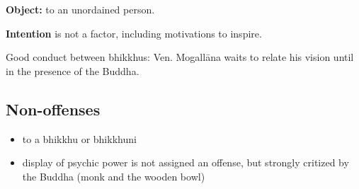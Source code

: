 \textbf{Object:} to an unordained person.

\textbf{Intention} is not a factor, including motivations to inspire.

Good conduct between bhikkhus: Ven. Mogallāna waits to relate his vision
until in the presence of the Buddha.

\subsection{Non-offenses}

\begin{itemize}
\tightlist
\item
  to a bhikkhu or bhikkhuni
\item
  display of psychic power is not assigned an offense, but strongly
  critized by the Buddha (monk and the wooden bowl)
\end{itemize}

